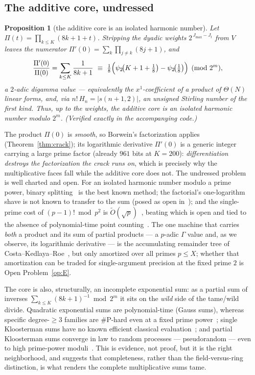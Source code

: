 \documentclass[11pt]{article}
\newtheorem{proposition}[theorem]{Proposition}
\theoremstyle{remark}
\theoremstyle{definition}
\begin{document}
\subsection{The additive core, undressed}

\begin{proposition}[the additive core is an isolated harmonic number]
\label{prop:atom}
Let $\Pi(t)=\prod_{k\le K}(8k+1+t)$. Stripping the dyadic weights
$2^{\,J_{\max}-J_t}$ from $V$ leaves the numerator
$\Pi'(0)=\sum_k\prod_{j\ne k}(8j+1)$, and
\[
\frac{\Pi'(0)}{\Pi(0)}=\sum_{k\le K}\frac{1}{8k+1}
\ \equiv\ \tfrac18\Bigl(\psi_2\!\bigl(K+1+\tfrac18\bigr)
-\psi_2\!\bigl(\tfrac18\bigr)\Bigr)\pmod{2^{m}},
\]
a $2$-adic digamma value --- equivalently the $x^{1}$-coefficient of a product
of $\Theta(N)$ linear forms, and, via $n!\,H_n=|s(n+1,2)|$, an unsigned
Stirling number of the first kind. Thus, up to the weights, the additive core
is an isolated harmonic number modulo $2^{m}$. (Verified exactly in the
accompanying code.)
\end{proposition}

The product $\Pi(0)$ is \emph{smooth}, so Borwein's factorization applies
(Theorem~\ref{thm:crack}); its logarithmic derivative $\Pi'(0)$ is a generic
integer carrying a large prime factor (already $961$ bits at $K=200$):
\emph{differentiation destroys the factorization the crack runs on}, which is
precisely why the multiplicative faces fall while the additive core does not.
The undressed problem is well charted and open. For an isolated harmonic number
modulo a prime power, binary splitting~\cite{BZ10} is the best known method; the
factorial's one-logarithm shave is not known to transfer to the sum (posed as
open in~\cite{Johansson09}); and the single-prime cost of $(p-1)!\bmod p^{2}$ is
$\widetilde{O}(\sqrt p)$~\cite{CGH14}, beating which is open and tied to the
absence of polynomial-time point counting~\cite{Harvey14}. The one machine that
carries \emph{both} a product and its sum of partial products --- a $p$-adic
$\Gamma$ value and, as we observe, its logarithmic derivative --- is the
accumulating remainder tree of Costa--Kedlaya--Roe~\cite{CKR20,CKR24}, but only
amortized over all primes $p\le X$; whether that amortization can be traded for
single-argument precision at the fixed prime $2$ is Open Problem~\ref{op:E}.

The core is also, structurally, an incomplete exponential sum: as a partial sum
of inverses $\sum_{k\le K}(8k+1)^{-1}\bmod 2^{m}$ it sits on the \emph{wild}
side of the tame/wild divide. Quadratic exponential sums are polynomial-time
(Gauss sums), whereas specific degree-$\ge3$ families are $\#\mathrm{P}$-hard
even at a fixed prime power~\cite{CCLL10}; single Kloosterman sums have no known
efficient classical evaluation~\cite{Bruin18}; and partial Kloosterman sums
converge in law to random processes --- pseudorandom --- even to high
prime-power moduli~\cite{KS16,MZ23}. This is evidence, not proof, but it is the
right neighborhood, and suggests that completeness, rather than the
field-versus-ring distinction, is what renders the complete multiplicative sums
tame.
\end{document}
